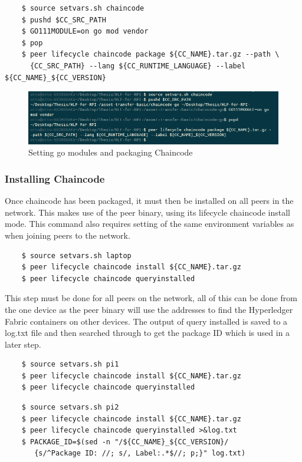 \begin{verbatim}
    $ source setvars.sh chaincode
    $ pushd $CC_SRC_PATH
    $ GO111MODULE=on go mod vendor
    $ pop
    $ peer lifecycle chaincode package ${CC_NAME}.tar.gz --path \
      {CC_SRC_PATH} --lang ${CC_RUNTIME_LANGUAGE} --label ${CC_NAME}_${CC_VERSION}
\end{verbatim}

\begin{figure}[h]
    \centering
    \includegraphics[width=1.2\columnwidth]{package chaincode.PNG}
    \caption{Setting go modules and packaging Chaincode}
    \label{fig:my_label}
\end{figure}

\subsubsection{Installing Chaincode}
Once chaincode has been packaged, it must then be installed on all peers in the network. This makes use of the peer binary, using its lifecycle chaincode install mode. This command also requires setting of the same environment variables as when joining peers to the network.

\begin{verbatim}
    $ source setvars.sh laptop
    $ peer lifecycle chaincode install ${CC_NAME}.tar.gz
    $ peer lifecycle chaincode queryinstalled
\end{verbatim}

This step must be done for all peers on the network, all of this can be done from the one device as the peer binary will use the addresses to find the Hyperledger Fabric containers on other devices. The output of query installed is saved to a log.txt file and then searched through to get the package ID which is used in a later step.

\begin{verbatim}
    $ source setvars.sh pi1
    $ peer lifecycle chaincode install ${CC_NAME}.tar.gz
    $ peer lifecycle chaincode queryinstalled
\end{verbatim}

\begin{verbatim}
    $ source setvars.sh pi2
    $ peer lifecycle chaincode install ${CC_NAME}.tar.gz
    $ peer lifecycle chaincode queryinstalled >&log.txt
    $ PACKAGE_ID=$(sed -n "/${CC_NAME}_${CC_VERSION}/
       {s/^Package ID: //; s/, Label:.*$//; p;}" log.txt)
\end{verbatim}


